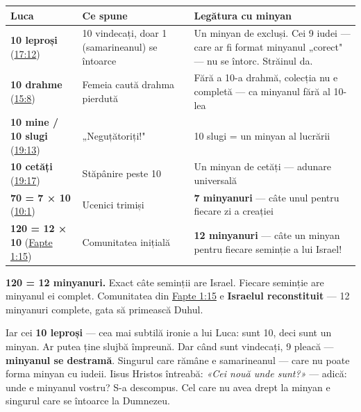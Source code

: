 \documentclass[12pt,a4paper,twoside,openany]{book}
\begin{document}
\begin{center}
\small
\begin{tabular}{L{2.2cm}L{4.1cm}L{8.6cm}}
\toprule
{}
\textbf{Luca} & \textbf{Ce spune} & \textbf{Legătura cu minyan} \\
\midrule
\textbf{10 leproși} (\href{https://bibliaortodoxa.ro/carte.php?id=48\&cap=17\#12}{17:12}) & 10 vindecați, doar 1 (samarineanul) se întoarce & Un minyan de excluși. Cei 9 iudei — care ar fi format minyanul „corect" — nu se întorc. Străinul da. \\
\textbf{10 drahme} (\href{https://bibliaortodoxa.ro/carte.php?id=48\&cap=15\#8}{15:8}) & Femeia caută drahma pierdută & Fără a 10-a drahmă, colecția nu e completă — ca minyanul fără al 10-lea \\
\textbf{10 mine / 10 slugi} (\href{https://bibliaortodoxa.ro/carte.php?id=48\&cap=19\#13}{19:13}) & „Neguțătoriți!" & 10 slugi = un minyan al lucrării \\
\textbf{10 cetăți} (\href{https://bibliaortodoxa.ro/carte.php?id=48\&cap=19\#17}{19:17}) & Stăpânire peste 10 & Un minyan de cetăți — adunare universală \\
\textbf{70 = 7 × 10} (\href{https://bibliaortodoxa.ro/carte.php?id=48\&cap=10\#1}{10:1}) & Ucenici trimiși & \textbf{7 minyanuri} — câte unul pentru fiecare zi a creației \\
\textbf{120 = 12 × 10} (\href{https://bibliaortodoxa.ro/carte.php?id=26\&cap=1\#15}{Fapte 1:15}) & Comunitatea inițială & \textbf{12 minyanuri} — câte un minyan pentru fiecare seminție a lui Israel! \\
\bottomrule
\end{tabular}
\end{center}
\normalsize
\textbf{120 = 12 minyanuri.} Exact câte seminții are Israel. Fiecare seminție are minyanul ei complet. Comunitatea din \href{https://bibliaortodoxa.ro/carte.php?id=26\&cap=1\#15}{Fapte 1:15} e \textbf{Israelul reconstituit} — 12 minyanuri complete, gata să primească Duhul.

Iar cei \textbf{10 leproși} — cea mai subtilă ironie a lui Luca: sunt 10, deci sunt un minyan. Ar putea ține slujbă împreună. Dar când sunt vindecați, 9 pleacă — \textbf{minyanul se destramă}. Singurul care rămâne e samarineanul — care nu poate forma minyan cu iudeii. Iisus Hristos întreabă: \textit{«Cei nouă unde sunt?»} — adică: unde e minyanul vostru? S-a descompus. Cel care nu avea drept la minyan e singurul care se întoarce la Dumnezeu.
\end{document}
